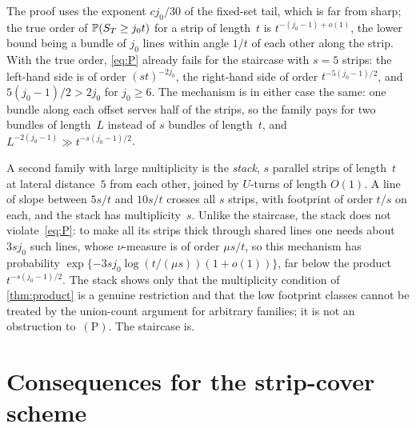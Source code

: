 \documentclass[11pt,letterpaper]{article}
\begin{document}
\begin{remark}
\label{rem:trueorder}
The proof uses the exponent $cj_0/30$ of the fixed-set tail, which is far from sharp; the true order of $\P(S_T\ge j_0t)$ for a strip of length~$t$ is $t^{-(j_0-1)+o(1)}$, the lower bound being a bundle of $j_0$ lines within angle $1/t$ of each other along the strip. With the true order, \eqref{eq:P} already fails for the staircase with $s=5$ strips: the left-hand side is of order $(st)^{-2j_0}$, the right-hand side of order $t^{-5(j_0-1)/2}$, and $5(j_0-1)/2>2j_0$ for $j_0\ge6$. The mechanism is in either case the same: one bundle along each offset serves half of the strips, so the family pays for two bundles of length~$L$ instead of $s$ bundles of length~$t$, and $L^{-2(j_0-1)}\gg t^{-s(j_0-1)/2}$.
\end{remark}

\begin{remark}
\label{rem:stack}
A second family with large multiplicity is the \emph{stack}, $s$ parallel strips of length~$t$ at lateral distance~$5$ from each other, joined by $U$-turns of length $O(1)$. A line of slope between $5s/t$ and $10s/t$ crosses all $s$ strips, with footprint of order $t/s$ on each, and the stack has multiplicity~$s$. Unlike the staircase, the stack does not violate~\eqref{eq:P}: to make all its strips thick through shared lines one needs about $3sj_0$ such lines, whose $\nu$-measure is of order $\mu s/t$, so this mechanism has probability $\exp\{-3sj_0\log(t/(\mu s))(1+o(1))\}$, far below the product $t^{-s(j_0-1)/2}$. The stack shows only that the multiplicity condition of \cref{thm:product} is a genuine restriction and that the low footprint classes cannot be treated by the union-count argument for arbitrary families; it is not an obstruction to~$\mathrm{(P)}$. The staircase is.
\end{remark}

\section{Consequences for the strip-cover scheme}
\label{sec:consequences}
\end{document}
